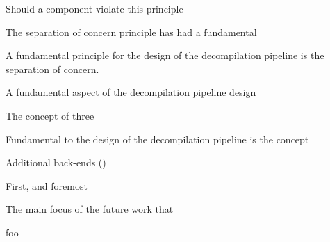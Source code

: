 Should a component violate this principle

The separation of concern principle has had a fundamental

A fundamental principle for the design of the decompilation pipeline is the separation of concern.

A fundamental aspect of the decompilation pipeline design

The concept of three

Fundamental to the design of the decompilation pipeline is the concept

Additional back-ends ()

First, and foremost





The main focus of the future work that











































foo
